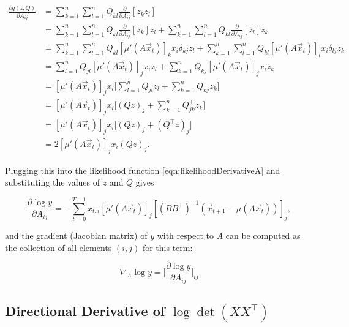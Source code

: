 \documentclass[12pt]{article}
\theoremstyle{definition}
\begin{document}
\begin{equation}
    \begin{split}
    \frac{\partial q(z; Q)}{\partial A_{ij}} & = \sum_{k=1}^{n} \sum_{l=1}^{n} Q_{kl} \frac{\partial}{\partial A_{ij}} [z_k z_l] \\
    & = \sum_{k=1}^{n} \sum_{l=1}^{n} Q_{kl} \frac{\partial}{\partial A_{ij}} [z_k] z_l+ \sum_{k=1}^{n} \sum_{l=1}^{n} Q_{kl} \frac{\partial}{\partial A_{ij}} [z_l] z_k \\
    &= \sum_{k=1}^{n} \sum_{l=1}^{n} Q_{kl} [\mu'(A\Vec{x}_t)]_k x_i \delta_{kj} z_l + \sum_{k=1}^{n} \sum_{l=1}^{n} Q_{kl} [\mu'(A\Vec{x}_t)]_l x_i \delta_{lj} z_k \\ 
    & = \sum_{l=1}^{n} Q_{jl} [\mu'(A\Vec{x}_t)]_j x_i z_l + \sum_{k=1}^{n}  Q_{kj} [\mu'(A\Vec{x}_t)]_j x_i z_k \\ 
    & =  [\mu'(A\Vec{x}_t)]_j x_i \big[\sum_{l=1}^{n} Q_{jl} z_l +  \sum_{k=1}^{n}  Q_{kj} z_k \big] \\ 
    & = [\mu'(A\Vec{x}_t)]_j x_i \big[(Qz)_j +  \sum_{k=1}^{n}  Q^\top_{jk} z_k \big] \\ 
    & = [\mu'(A\Vec{x}_t)]_j x_i \big[(Qz)_j +  (Q^\top z)_j \big] \\ 
    & = 2 [\mu'(A\Vec{x}_t)]_j x_i (Qz)_j.
\end{split}
\end{equation}

Plugging this into the likelihood function \ref{eqn:likelihoodDerivativeA} and substituting the values of $z$ and $Q$ gives

\begin{equation}
    \label{eqn:gradAElementWise}
    \frac{\partial \log y}{\partial A_{ij}} = - \sum_{t=0}^{T-1} x_{t,i} [\mu'(A\Vec{x}_t)]_j [(BB^\top)^{-1} (\Vec{x}_{t+1} - \mu(A\Vec{x}_t))]_j,
\end{equation}

and the gradient (Jacobian matrix) of $y$ with respect to $A$ can be computed as the collection of all elements $(i,j)$ for this term:

\begin{equation}
    \nabla_A \log y = \bigg[\frac{\partial \log y}{\partial A_{ij}} \bigg]_{ij}
\end{equation}

\subsection{Directional Derivative of $\log \det (XX^\top)$}
\label{subsec:gradLogDetDerivation}
\end{document}
